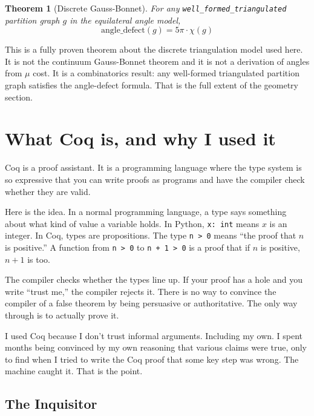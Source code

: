\documentclass[11pt,a4paper]{article}
\theoremstyle{plain}
\newtheorem{theorem}{Theorem}[section]
\theoremstyle{definition}
\theoremstyle{remark}
\begin{document}
\begin{theorem}[Discrete Gauss-Bonnet]
For any \texttt{well\_formed\_triangulated} partition graph $g$ in the equilateral angle model,
\[
\mathrm{angle\_defect}(g) = 5\pi \cdot \chi(g)
\]
\end{theorem}

This is a fully proven theorem about the discrete triangulation model used here. It is not the continuum Gauss-Bonnet theorem and it is not a derivation of angles from $\mu$ cost. It is a combinatorics result: any well-formed triangulated partition graph satisfies the angle-defect formula. That is the full extent of the geometry section.

\section{What Coq is, and why I used it}
\label{sec:coq}

Coq is a proof assistant. It is a programming language where the type system is so expressive that you can write proofs as programs and have the compiler check whether they are valid.

Here is the idea. In a normal programming language, a type says something about what kind of value a variable holds. In Python, \texttt{x: int} means $x$ is an integer. In Coq, types are propositions. The type \texttt{n > 0} means ``the proof that $n$ is positive.'' A function from \texttt{n > 0} to \texttt{n + 1 > 0} is a proof that if $n$ is positive, $n+1$ is too.

The compiler checks whether the types line up. If your proof has a hole and you write ``trust me,'' the compiler rejects it. There is no way to convince the compiler of a false theorem by being persuasive or authoritative. The only way through is to actually prove it.

I used Coq because I don't trust informal arguments. Including my own. I spent months being convinced by my own reasoning that various claims were true, only to find when I tried to write the Coq proof that some key step was wrong. The machine caught it. That is the point.

\subsection{The Inquisitor}
\end{document}
